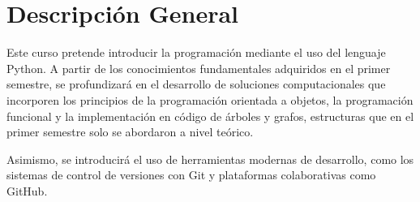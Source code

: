 \section{Descripción General}

Este curso pretende introducir la programación mediante el uso del lenguaje Python.
A partir de los conocimientos fundamentales adquiridos en el primer semestre, se profundizará en el desarrollo de soluciones computacionales que incorporen los principios de la programación orientada a objetos, la programación funcional y la implementación en código de árboles y grafos, estructuras que en el primer semestre solo se abordaron a nivel teórico.

Asimismo, se introducirá el uso de herramientas modernas de desarrollo, como los sistemas de control de versiones con Git y plataformas colaborativas como GitHub.
